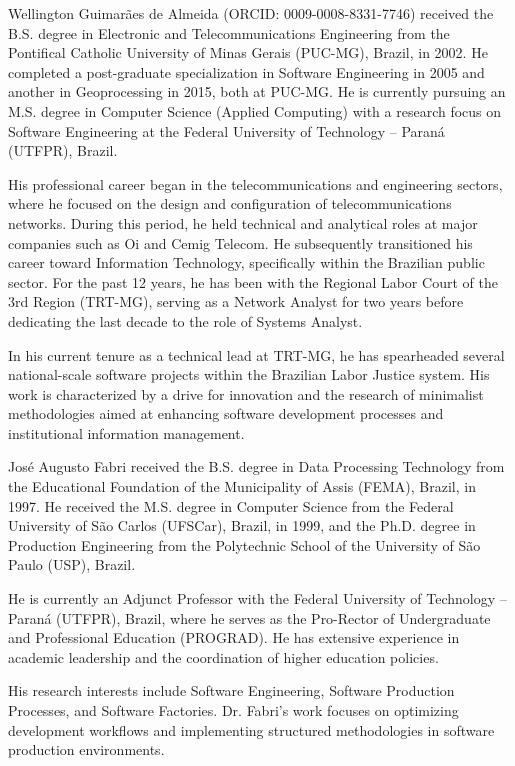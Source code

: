 \documentclass{ieeeaccess}
\begin{document}
\begin{IEEEbiographynophoto}{Wellington Guimarães de Almeida} (ORCID: 0009-0008-8331-7746)
received the B.S. degree in Electronic and Telecommunications Engineering from the Pontifical Catholic University of Minas Gerais (PUC-MG), Brazil, in 2002. He completed a post-graduate specialization in Software Engineering in 2005 and another in Geoprocessing in 2015, both at PUC-MG. He is currently pursuing an M.S. degree in Computer Science (Applied Computing) with a research focus on Software Engineering at the Federal University of Technology – Paraná (UTFPR), Brazil.

His professional career began in the telecommunications and engineering sectors, where he focused on the design and configuration of telecommunications networks. During this period, he held technical and analytical roles at major companies such as Oi and Cemig Telecom. He subsequently transitioned his career toward Information Technology, specifically within the Brazilian public sector. For the past 12 years, he has been with the Regional Labor Court of the 3rd Region (TRT-MG), serving as a Network Analyst for two years before dedicating the last decade to the role of Systems Analyst.

In his current tenure as a technical lead at TRT-MG, he has spearheaded several national-scale software projects within the Brazilian Labor Justice system. His work is characterized by a drive for innovation and the research of minimalist methodologies aimed at enhancing software development processes and institutional information management.
\end{IEEEbiographynophoto}

\begin{IEEEbiographynophoto}{José Augusto Fabri}
received the B.S. degree in Data Processing Technology from the Educational Foundation of the Municipality of Assis (FEMA), Brazil, in 1997. He received the M.S. degree in Computer Science from the Federal University of São Carlos (UFSCar), Brazil, in 1999, and the Ph.D. degree in Production Engineering from the Polytechnic School of the University of São Paulo (USP), Brazil.

He is currently an Adjunct Professor with the Federal University of Technology – Paraná (UTFPR), Brazil, where he serves as the Pro-Rector of Undergraduate and Professional Education (PROGRAD). He has extensive experience in academic leadership and the coordination of higher education policies.

His research interests include Software Engineering, Software Production Processes, and Software Factories. Dr. Fabri’s work focuses on optimizing development workflows and implementing structured methodologies in software production environments.
\end{IEEEbiographynophoto}

\EOD
\end{document}

